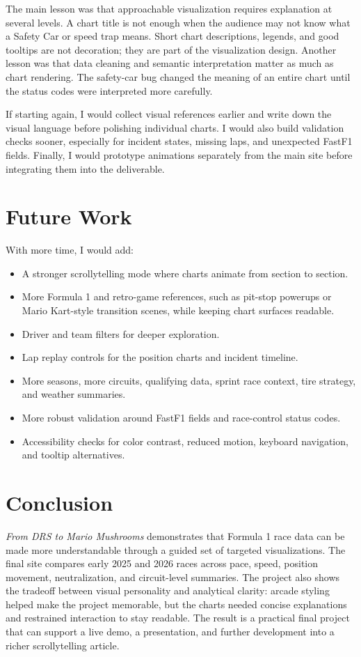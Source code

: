 \documentclass[conference]{IEEEtran}
\begin{document}
The main lesson was that approachable visualization requires explanation at several levels. A chart title is not enough when the audience may not know what a Safety Car or speed trap means. Short chart descriptions, legends, and good tooltips are not decoration; they are part of the visualization design. Another lesson was that data cleaning and semantic interpretation matter as much as chart rendering. The safety-car bug changed the meaning of an entire chart until the status codes were interpreted more carefully.

If starting again, I would collect visual references earlier and write down the visual language before polishing individual charts. I would also build validation checks sooner, especially for incident states, missing laps, and unexpected FastF1 fields. Finally, I would prototype animations separately from the main site before integrating them into the deliverable.

\section{Future Work}
With more time, I would add:
\begin{itemize}
    \item A stronger scrollytelling mode where charts animate from section to section.
    \item More Formula 1 and retro-game references, such as pit-stop powerups or Mario Kart-style transition scenes, while keeping chart surfaces readable.
    \item Driver and team filters for deeper exploration.
    \item Lap replay controls for the position charts and incident timeline.
    \item More seasons, more circuits, qualifying data, sprint race context, tire strategy, and weather summaries.
    \item More robust validation around FastF1 fields and race-control status codes.
    \item Accessibility checks for color contrast, reduced motion, keyboard navigation, and tooltip alternatives.
\end{itemize}

\section{Conclusion}
\emph{From DRS to Mario Mushrooms} demonstrates that Formula 1 race data can be made more understandable through a guided set of targeted visualizations. The final site compares early 2025 and 2026 races across pace, speed, position movement, neutralization, and circuit-level summaries. The project also shows the tradeoff between visual personality and analytical clarity: arcade styling helped make the project memorable, but the charts needed concise explanations and restrained interaction to stay readable. The result is a practical final project that can support a live demo, a presentation, and further development into a richer scrollytelling article.



\end{document}
